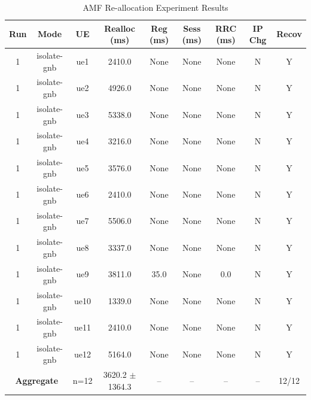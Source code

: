 \begin{table}[ht]
\centering
\begin{tabular}{|c|c|c|c|c|c|c|c|c|}
\hline
Run & Mode & UE & Realloc (ms) & Reg (ms) & Sess (ms) & RRC (ms) & IP Chg & Recov \\
\hline
1 & isolate-gnb & ue1 & 2410.0 & None & None & None & N & Y \\
1 & isolate-gnb & ue2 & 4926.0 & None & None & None & N & Y \\
1 & isolate-gnb & ue3 & 5338.0 & None & None & None & N & Y \\
1 & isolate-gnb & ue4 & 3216.0 & None & None & None & N & Y \\
1 & isolate-gnb & ue5 & 3576.0 & None & None & None & N & Y \\
1 & isolate-gnb & ue6 & 2410.0 & None & None & None & N & Y \\
1 & isolate-gnb & ue7 & 5506.0 & None & None & None & N & Y \\
1 & isolate-gnb & ue8 & 3337.0 & None & None & None & N & Y \\
1 & isolate-gnb & ue9 & 3811.0 & 35.0 & None & 0.0 & N & Y \\
1 & isolate-gnb & ue10 & 1339.0 & None & None & None & N & Y \\
1 & isolate-gnb & ue11 & 2410.0 & None & None & None & N & Y \\
1 & isolate-gnb & ue12 & 5164.0 & None & None & None & N & Y \\
\multicolumn{2}{|c|}{\textbf{Aggregate}} & n=12 & 3620.2 $\pm$ 1364.3 & -- & -- & -- & -- & 12/12 \\
\hline
\end{tabular}
\caption{AMF Re-allocation Experiment Results}
\label{tab:amf_realloc}
\end{table}
